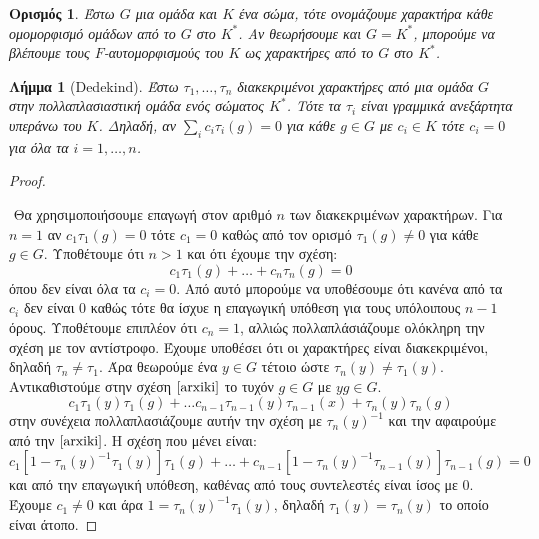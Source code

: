 \documentclass[oneside,a4paper]{article}
\newtheorem{lemma}{Λήμμα}
\newtheorem*{defn}{Ορισμός}
\newcommand {\tl}{\textlatin}
\begin{document}
\vspace{0.1cm}
\begin{defn}
	Έστω $G$ μια ομάδα και $K$ ένα σώμα, τότε ονομάζουμε χαρακτήρα κάθε ομομορφισμό ομάδων από το $G$ στο $K^*$. Αν θεωρήσουμε και $G=K^*$, μπορούμε να βλέπουμε τους $F$-αυτομορφισμούς του $K$ ως χαρακτήρες από το $G$ στο $K^*$.
\end{defn}
\vspace{0.1cm}
\begin{lemma}[\tl{Dedekind}]
	Έστω $\tau_1 , \ldots, \tau_n$ διακεκριμένοι χαρακτήρες από μια ομάδα $G$ στην πολλαπλασιαστική ομάδα ενός σώματος $K^*$. Τότε τα $\tau_i$ είναι γραμμικά ανεξάρτητα υπεράνω του $K$. Δηλαδή, αν $\sum\limits_i c_i \tau_i (g) = 0$ για κάθε $g \in G$ με $c_i \in K$ τότε $c_i = 0$ για όλα τα $i =1,\ldots,n$. 
\end{lemma}
\begin{proof} $ $
	
	$ $\newline
	Θα χρησιμοποιήσουμε επαγωγή στον αριθμό $n$ των διακεκριμένων χαρακτήρων. Για $n=1$ αν $c_1 \tau_1 (g) = 0$ τότε $c_1 =0$ καθώς από τον ορισμό $\tau_1 (g) \neq 0 $ για κάθε $g \in G$. Υποθέτουμε ότι $n>1$ και ότι έχουμε την σχέση:
	\begin{equation}
		\label{arxiki}
		c_1 \tau_1 (g) + \ldots + c_n \tau_n (g) = 0
	\end{equation}
	όπου δεν είναι όλα τα $c_i = 0$. Από αυτό μπορούμε να υποθέσουμε ότι κανένα από τα $c_i$ δεν είναι $0$ καθώς τότε θα ίσχυε η επαγωγική υπόθεση για τους υπόλοιπους $n-1$ όρους. Υποθέτουμε επιπλέον ότι $c_n = 1$, αλλιώς πολλαπλάσιάζουμε ολόκληρη την σχέση με τον αντίστροφο. Έχουμε υποθέσει ότι οι χαρακτήρες είναι διακεκριμένοι, δηλαδή $\tau_n \neq \tau_1$. Άρα θεωρούμε ένα $y \in G$ τέτοιο ώστε $\tau_n (y) \neq \tau_1 (y)$. Αντικαθιστούμε στην σχέση $\ref{arxiki}$ το τυχόν $g \in G$ με $yg \in G$.
	$$c_1 \tau_1 (y) \tau_1 (g) + \ldots c_{n-1} \tau_{n-1} (y) \tau_{n-1} (x) + \tau_{n}(y) \tau_n (g)$$
	στην συνέχεια πολλαπλασιάζουμε αυτήν την σχέση με $\tau_n (y)^{-1}$ και την αφαιρούμε από την $\ref{arxiki}$. Η σχέση που μένει είναι:
	$$c_1 [1- \tau_n (y)^{-1}\tau_1 (y)] \tau_1 (g) + \ldots + c_{n-1} [1- \tau_n (y)^{-1}\tau_{n-1} (y)] \tau_{n-1} (g) = 0$$
	και από την επαγωγική υπόθεση, καθένας από τους συντελεστές είναι ίσος με $0$. Έχουμε $c_1 \neq 0$ και άρα $1 = \tau_n (y)^{-1} \tau_1 (y)$, δηλαδή $\tau_1 (y) = \tau_n (y)$ το οποίο είναι άτοπο. 
	
\end{proof}
\end{document}
